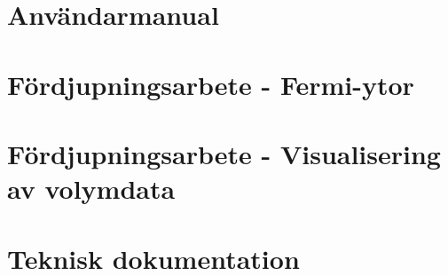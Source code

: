 \documentclass[a4paper,12pt]{article}
\begin{document}
\begin{appendices}

\section{Användarmanual}
\label{appendix:användarmanual}





\section{Fördjupningsarbete - Fermi-ytor}
\label{appendix:fermi-ytor}

\section{Fördjupningsarbete - Visualisering av volymdata}
\label{appendix:visualisering}

















\section{Teknisk dokumentation}
\label{appendix:teknisk-dokumentation}


\end{appendices}
\end{document}
